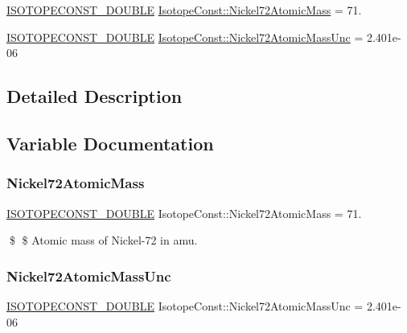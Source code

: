 \begin{DoxyCompactItemize}
\item 
\mbox{\hyperlink{group___isotope_const-_macros_ga8f45a7272ce02c0b4c65c44636ed719a}{I\+S\+O\+T\+O\+P\+E\+C\+O\+N\+S\+T\+\_\+\+D\+O\+U\+B\+LE}} \mbox{\hyperlink{group___isotope_const-_nickel-_ni72_gacb00cf43b1c88cbb48f5743f19f6bc26}{Isotope\+Const\+::\+Nickel72\+Atomic\+Mass}} = 71.
\item 
\mbox{\hyperlink{group___isotope_const-_macros_ga8f45a7272ce02c0b4c65c44636ed719a}{I\+S\+O\+T\+O\+P\+E\+C\+O\+N\+S\+T\+\_\+\+D\+O\+U\+B\+LE}} \mbox{\hyperlink{group___isotope_const-_nickel-_ni72_ga626b0f6da0c3f1785a531c3c56ded3e5}{Isotope\+Const\+::\+Nickel72\+Atomic\+Mass\+Unc}} = 2.\+401e-\/06
\end{DoxyCompactItemize}


\subsection{Detailed Description}


\subsection{Variable Documentation}
\mbox{\label{group___isotope_const-_nickel-_ni72_gacb00cf43b1c88cbb48f5743f19f6bc26}} 
\subsubsection{\texorpdfstring{Nickel72\+Atomic\+Mass}{Nickel72AtomicMass}}
{\footnotesize\ttfamily \mbox{\hyperlink{group___isotope_const-_macros_ga8f45a7272ce02c0b4c65c44636ed719a}{I\+S\+O\+T\+O\+P\+E\+C\+O\+N\+S\+T\+\_\+\+D\+O\+U\+B\+LE}} Isotope\+Const\+::\+Nickel72\+Atomic\+Mass = 71.}

\$ \$ Atomic mass of Nickel-\/72 in amu. \mbox{\label{group___isotope_const-_nickel-_ni72_ga626b0f6da0c3f1785a531c3c56ded3e5}} 
\subsubsection{\texorpdfstring{Nickel72\+Atomic\+Mass\+Unc}{Nickel72AtomicMassUnc}}
{\footnotesize\ttfamily \mbox{\hyperlink{group___isotope_const-_macros_ga8f45a7272ce02c0b4c65c44636ed719a}{I\+S\+O\+T\+O\+P\+E\+C\+O\+N\+S\+T\+\_\+\+D\+O\+U\+B\+LE}} Isotope\+Const\+::\+Nickel72\+Atomic\+Mass\+Unc = 2.\+401e-\/06}

